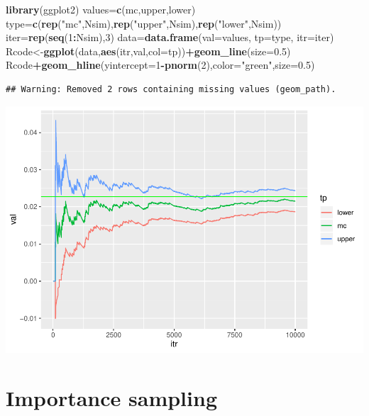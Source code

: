 \documentclass[]{book}
\newenvironment{Shaded}{\begin{snugshade}}{\end{snugshade}}
\newcommand{\KeywordTok}[1]{\textcolor[rgb]{0.13,0.29,0.53}{\textbf{#1}}}
\newcommand{\DataTypeTok}[1]{\textcolor[rgb]{0.13,0.29,0.53}{#1}}
\newcommand{\DecValTok}[1]{\textcolor[rgb]{0.00,0.00,0.81}{#1}}
\newcommand{\FloatTok}[1]{\textcolor[rgb]{0.00,0.00,0.81}{#1}}
\newcommand{\StringTok}[1]{\textcolor[rgb]{0.31,0.60,0.02}{#1}}
\newcommand{\OperatorTok}[1]{\textcolor[rgb]{0.81,0.36,0.00}{\textbf{#1}}}
\newcommand{\NormalTok}[1]{#1}
\begin{document}
\begin{Shaded}
\begin{Highlighting}[]
\KeywordTok{library}\NormalTok{(ggplot2)}
\NormalTok{values=}\KeywordTok{c}\NormalTok{(mc,upper,lower)}
\NormalTok{type=}\KeywordTok{c}\NormalTok{(}\KeywordTok{rep}\NormalTok{(}\StringTok{"mc"}\NormalTok{,Nsim),}\KeywordTok{rep}\NormalTok{(}\StringTok{"upper"}\NormalTok{,Nsim),}\KeywordTok{rep}\NormalTok{(}\StringTok{"lower"}\NormalTok{,Nsim))}
\NormalTok{iter=}\KeywordTok{rep}\NormalTok{(}\KeywordTok{seq}\NormalTok{(}\DecValTok{1}\OperatorTok{:}\NormalTok{Nsim),}\DecValTok{3}\NormalTok{)}
\NormalTok{data=}\KeywordTok{data.frame}\NormalTok{(}\DataTypeTok{val=}\NormalTok{values, }\DataTypeTok{tp=}\NormalTok{type, }\DataTypeTok{itr=}\NormalTok{iter)}
\NormalTok{Rcode<-}\KeywordTok{ggplot}\NormalTok{(data,}\KeywordTok{aes}\NormalTok{(itr,val,}\DataTypeTok{col=}\NormalTok{tp))}\OperatorTok{+}\KeywordTok{geom_line}\NormalTok{(}\DataTypeTok{size=}\FloatTok{0.5}\NormalTok{)}
\NormalTok{Rcode}\OperatorTok{+}\KeywordTok{geom_hline}\NormalTok{(}\DataTypeTok{yintercept=}\DecValTok{1}\OperatorTok{-}\KeywordTok{pnorm}\NormalTok{(}\DecValTok{2}\NormalTok{),}\DataTypeTok{color=}\StringTok{"green"}\NormalTok{,}\DataTypeTok{size=}\FloatTok{0.5}\NormalTok{)}
\end{Highlighting}
\end{Shaded}

\begin{verbatim}
## Warning: Removed 2 rows containing missing values (geom_path).
\end{verbatim}

\includegraphics{bookdown-demo_files/figure-latex/unnamed-chunk-17-1.pdf}

\section{Importance sampling}\label{importance-sampling}
\end{document}
